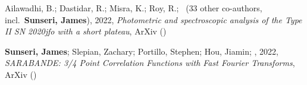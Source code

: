 \item Ailawadhi, B.; Dastidar, R.; Misra, K.; Roy, R.; \etal\ ({33} other co-authors, incl.\ \textbf{Sunseri, James}), 2022, \emph{Photometric and spectroscopic analysis of the Type II SN 2020jfo with a short plateau}, ArXiv ()

\item \textbf{Sunseri, James}; Slepian, Zachary; Portillo, Stephen; Hou, Jiamin; \etal, 2022, \emph{SARABANDE: 3/4 Point Correlation Functions with Fast Fourier Transforms}, ArXiv ()